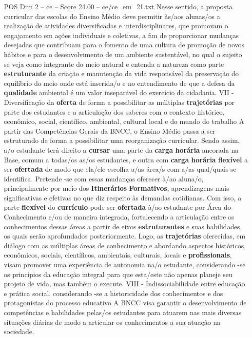 \begin{textsample}{POS Dim 2 – ce – Score 24.00 – ce/ce\_em\_21.txt}
Nesse sentido, a proposta curricular das escolas do Ensino Médio deve permitir às/aos alunas/os a realização de atividades diversificadas e interdisciplinares, que promovam o engajamento em ações individuais e coletivas, a fim de proporcionar mudanças desejadas que contribuam para o fomento de uma cultura de promoção de novos hábitos e para o desenvolvimento de um ambiente sustentável, no qual o sujeito se veja como integrante do meio natural e entenda a natureza como parte \textbf{estruturante} da criação e manutenção da vida responsável da preservação do equilíbrio do meio onde está inserida/o e no entendimento de que a defesa da \textbf{qualidade} ambiental é um valor inseparável do exercício da cidadania.
VII - Diversificação da \textbf{oferta} de forma a possibilitar as múltiplas \textbf{trajetórias} por parte dos estudantes e a articulação dos saberes com o contexto histórico, econômico, social, científico, ambiental, cultural local e do mundo do trabalho A partir das Competências Gerais da BNCC, o Ensino Médio passa a ser estruturado de forma a possibilitar uma reorganização curricular.
Sendo assim, a/o estudante terá direito a \textbf{cursar} uma parte da \textbf{carga} \textbf{horária} ancorada na Base, comum a todas/os as/os estudantes, e outra com \textbf{carga} \textbf{horária} \textbf{flexível} a ser \textbf{ofertada} de modo que ela/ele escolha a/as área/s com a/as qual/quais se identifica.
Pretende -se com essas mudanças oferecer à/ao aluna/o, principalmente por meio dos \textbf{Itinerários} \textbf{Formativos}, aprendizagens mais significativas e efetivas no que diz respeito às demandas cotidianas.
Com isso, a parte \textbf{flexível} do \textbf{currículo} pode ser \textbf{ofertada} à/ao estudante por Área do Conhecimento e/ou de maneira integrada, fortalecendo a articulação entre os conhecimentos dessas áreas a partir de eixos \textbf{estruturantes} e suas habilidades, os quais serão aprofundados posteriormente.
Logo, as \textbf{trajetórias} oferecidas, em diálogo com as múltiplas áreas de conhecimento e abordando aspectos históricos, econômicos, sociais, científicos, ambientais, culturais, locais e \textbf{profissionais}, visam promover uma experiência de autonomia na/o estudante, considerando -se os princípios da educação integral para que esta/este não apenas planeje seu projeto de vida, mas também o execute.
VIII - Indissociabilidade entre educação e prática social, considerando -se a historicidade dos conhecimentos e dos protagonistas do processo educativo A BNCC visa garantir o desenvolvimento de competências e habilidades pelas/os estudantes para atuarem nas mais diversas situações diárias de modo a articular os conhecimentos a sua atuação na sociedade.

\end{textsample}
